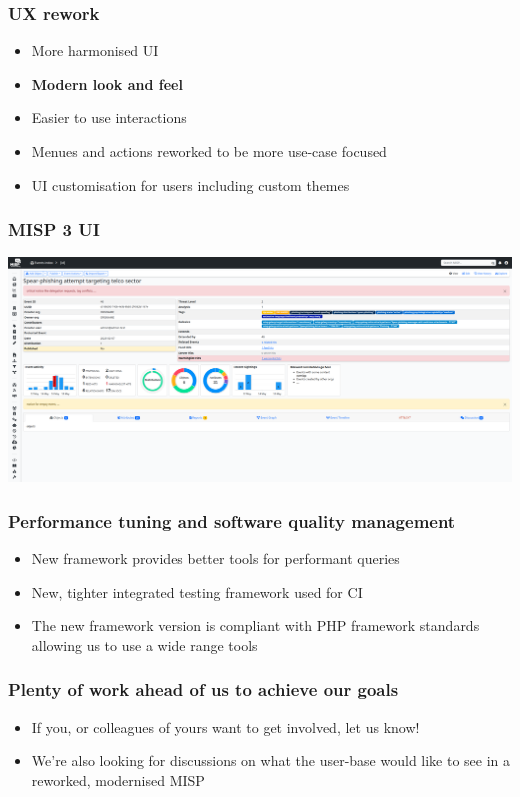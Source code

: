 \begin{frame}
  \frametitle{UX rework}
  \begin{itemize}
     \item More harmonised UI
     \item {\bf Modern look and feel}
     \item Easier to use interactions
     \item Menues and actions reworked to be more use-case focused
     \item UI customisation for users including custom themes
  \end{itemize}
\end{frame}

\begin{frame}
\frametitle{MISP 3 UI}
\begin{center}
\includegraphics[scale=0.18]{images/misp3.png}
\end{center}
\end{frame}

\begin{frame}
  \frametitle{Performance tuning and software quality management}
  \begin{itemize}
     \item New framework provides better tools for performant queries
     \item New, tighter integrated testing framework used for CI
     \item The new framework version is compliant with PHP framework standards allowing us to use a wide range tools
  \end{itemize}
\end{frame}

\begin{frame}
  \frametitle{Plenty of work ahead of us to achieve our goals}
  \begin{itemize}
     \item If you, or colleagues of yours want to get involved, let us know!
     \item We're also looking for discussions on what the user-base would like to see in a reworked, modernised MISP
  \end{itemize}
\end{frame}


